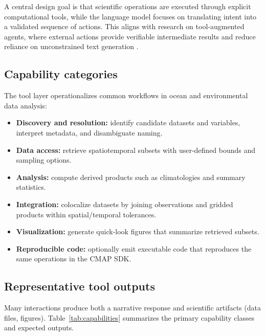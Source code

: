 A central design goal is that scientific operations are executed through explicit computational tools, while the language model focuses on translating intent into a validated sequence of actions.
This aligns with research on tool-augmented agents, where external actions provide verifiable intermediate results and reduce reliance on unconstrained text generation \citep{Yao2022ReAct,Karpas2022MRKL}.

\subsection{Capability categories}
The tool layer operationalizes common workflows in ocean and environmental data analysis:
\begin{itemize}[leftmargin=*]
  \item \textbf{Discovery and resolution:} identify candidate datasets and variables, interpret metadata, and disambiguate naming.
  \item \textbf{Data access:} retrieve spatiotemporal subsets with user-defined bounds and sampling options.
  \item \textbf{Analysis:} compute derived products such as climatologies and summary statistics.
  \item \textbf{Integration:} colocalize datasets by joining observations and gridded products within spatial/temporal tolerances.
  \item \textbf{Visualization:} generate quick-look figures that summarize retrieved subsets.
  \item \textbf{Reproducible code:} optionally emit executable code that reproduces the same operations in the CMAP SDK.
\end{itemize}

\subsection{Representative tool outputs}
Many interactions produce both a narrative response and scientific artifacts (data files, figures).
Table~\ref{tab:capabilities} summarizes the primary capability classes and expected outputs.

